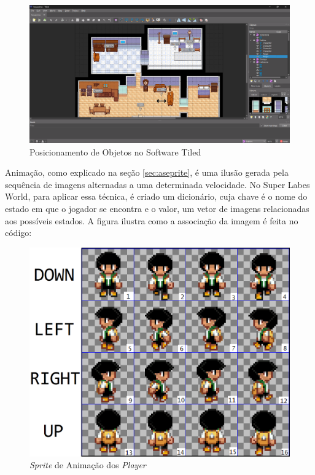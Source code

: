 \begin{landscape}
    \begin{figure}[h!]
        \centering
        \includegraphics[width=1\linewidth]{figuras/tiled-house.png}
        \caption{Posicionamento de Objetos no Software Tiled }
        \label{fig:tiled-house}
    \end{figure}
\end{landscape}


\clearpage
Animação, como explicado na seção \ref{sec:aseprite}, é uma ilusão gerada pela sequência de imagens alternadas a uma determinada velocidade. No Super Labes World, para aplicar essa técnica, é criado um dicionário, cuja chave é o nome do estado em que o jogador se encontra e o valor, um vetor de imagens relacionadas aos possíveis estados. A figura ilustra como a associação da imagem é feita no código:
\begin{figure}[h!]
    \centering
    \includegraphics[width=1\linewidth]{figuras/player-animation.png}
    \caption{\textit{Sprite} de Animação dos \textit{Player} }
    \label{fig:player-animation}
\end{figure}

